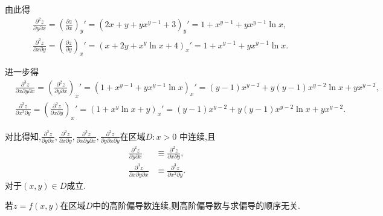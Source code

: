 由此得
\begin{align*}
    &\frac{\partial^2 z}{\partial y \partial x} = \left( \frac{\partial z}{\partial x} \right)_y' = (2x + y + yx^{y-1} +3)_y' = 1 + x^{y-1} + y x^{y-1} \ln x, \\
    &\frac{\partial^2 z}{\partial x \partial y} = \left( \frac{\partial z}{\partial y} \right)_x' = (x + 2y + x^y \ln x + 4)_x' = 1 + x^{y-1} + y x^{y-1} \ln x.
\end{align*}

进一步得
\begin{align*}
    &\frac{\partial^3 z}{\partial x \partial y \partial x} = \left( \frac{\partial^2 z}{\partial y \partial x} \right)_x' = \left( 1 + x^{y-1} + y x^{y-1} \ln x \right)_x' =(y-1) x^{y-2} + y(y-1)x^{y-2} \ln x + y x^{y-2},\\
    &\frac{\partial^3 z}{\partial x^2 \partial y} = \left( \frac{\partial^2 z}{\partial x \partial y} \right)_x' = \left( 1 + x^y \ln x + y \right)_x' = (y-1) x^{y-2} + y(y-1)x^{y-2} \ln x + y x^{y-2}.
\end{align*}

对比得知,$\frac{\partial^2 z}{\partial y \partial x} ,\frac{\partial^2 z}{\partial x \partial y},\frac{\partial^2 z}{\partial x \partial y \partial x},\frac{\partial^2 z}{\partial y \partial x \partial y}$在区域$D:x >0$ 中连续,且
\begin{align*}
    \frac{\partial^2 z}{\partial y \partial x} & \equiv \frac{\partial^2 z}{\partial x \partial y}, \\
    \frac{\partial^3 z}{\partial x \partial y \partial x} & \equiv \frac{\partial^3 z}{\partial x^2 \partial y}.
\end{align*}
对于$(x,y) \in D$成立.

\begin{theorem}
    若$z = f(x,y)$在区域$D$中的高阶偏导数连续,则高阶偏导数与求偏导的顺序无关.
\end{theorem}

